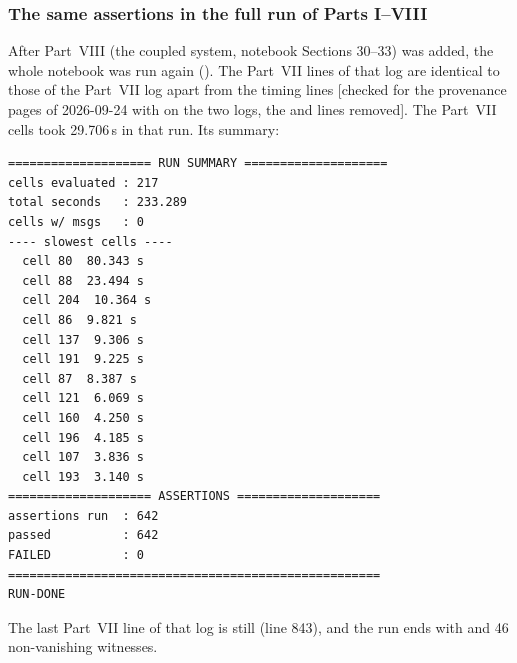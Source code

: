 \subsubsection{The same assertions in the full run of Parts I--VIII}
\label{sec:3.9.3}

After Part~VIII (the coupled system, notebook Sections 30--33) was added, the whole notebook was run
again (). The Part~VII lines of that log are identical
to those of the Part~VII log apart from the timing lines [checked for the provenance pages of  2026-09-24 with  on
the two logs, the  and \cfcode{[t s]} lines removed]. The Part~VII cells took 29.706\,s
in that run. Its summary:

\begin{Verbatim}[fontsize=\scriptsize]
==================== RUN SUMMARY ====================
cells evaluated : 217
total seconds   : 233.289
cells w/ msgs   : 0
---- slowest cells ----
  cell 80  80.343 s
  cell 88  23.494 s
  cell 204  10.364 s
  cell 86  9.821 s
  cell 137  9.306 s
  cell 191  9.225 s
  cell 87  8.387 s
  cell 121  6.069 s
  cell 160  4.250 s
  cell 196  4.185 s
  cell 107  3.836 s
  cell 193  3.140 s
==================== ASSERTIONS ====================
assertions run  : 642
passed          : 642
FAILED          : 0
====================================================
RUN-DONE
\end{Verbatim}

The last Part~VII line of that log is still 
(line 843), and the run ends with  and 46
non-vanishing witnesses.

